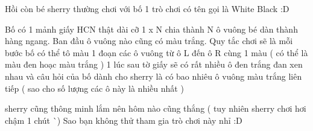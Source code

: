 Hồi còn bé sherry thường chơi với bố 1 trò chơi có tên gọi là White Black :D  

   Bố có 1 mảnh giấy HCN thật dài cỡ 1 x N chia thành N ô vuông bé dàn thành hàng ngang. Ban đầu ô vuông nào cũng có màu trắng. Quy tắc chơi sẽ là mỗi bước bố có thể tô màu 1 đoạn các ô vuông từ ô L đến ô R cùng 1 màu ( có thể là màu đen hoạc màu trắng ) 1 lúc sau tờ giấy sẽ có rất nhiều ô đen trắng đan xen nhau và câu hỏi của bố dành cho sherry là có bao nhiêu ô vuông màu trắng liên tiếp ( sao cho số lượng các ô này là nhiều nhất )  

   sherry cũng thông minh lắm nên hôm nào cũng thắng ( tuy nhiên sherry chơi hơi chậm 1 chút ^^ ) Sao bạn không thử tham gia trò chơi này nhỉ :D  

\